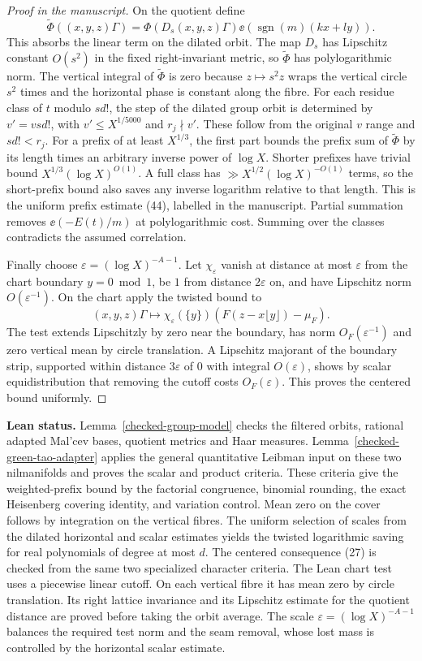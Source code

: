 \begin{proof}[Proof in the manuscript]
On the quotient define
\[
 \widetilde\Phi((x,y,z)\Gamma)
 =\Phi(D_s(x,y,z)\Gamma)\ee(\operatorname{sgn}(m)(kx+ly)).
\]
This absorbs the linear term on the dilated orbit. The map
$D_s$ has Lipschitz constant $O(s^2)$ in the fixed right-invariant
metric, so $\widetilde\Phi$ has polylogarithmic norm. The vertical
integral of $\widetilde\Phi$ is zero because $z\mapsto s^2z$ wraps the
vertical circle $s^2$ times and the horizontal phase is constant
along the fibre. For each residue class of $t$ modulo $sd!$,
the step of the dilated group orbit is determined by $v'=vsd!$,
with $v'\le X^{1/5000}$ and $r_j\nmid v'$.
These follow from the original $v$ range and $sd!<r_j$.
For a prefix of at least $X^{1/3}$, the first part bounds the
prefix sum of $\widetilde\Phi$ by its length times an arbitrary
inverse power of $\log X$. Shorter prefixes have trivial bound
$X^{1/3}(\log X)^{O(1)}$. A full class has
$\gg X^{1/2}(\log X)^{-O(1)}$ terms, so the short-prefix
bound also saves any inverse logarithm relative to that length.
This is the uniform prefix estimate (44), labelled
 in the manuscript.
Partial summation removes $\ee(-E(t)/m)$ at polylogarithmic cost.
Summing over the classes contradicts the assumed correlation.

Finally choose $\varepsilon=(\log X)^{-A-1}$. Let
$\chi_\varepsilon$ vanish at distance at most $\varepsilon$ from
the chart boundary $y=0\bmod1$, be $1$ from distance
$2\varepsilon$ on, and have Lipschitz norm $O(\varepsilon^{-1})$.
On the chart apply the twisted bound to
\[
 (x,y,z)\Gamma\longmapsto \chi_\varepsilon(\{y\})
     (F(z-x\lfloor y\rfloor)-\mu_F).
\]
The test extends Lipschitzly by zero near the boundary, has norm
$O_F(\varepsilon^{-1})$ and zero vertical mean by circle
translation. A Lipschitz majorant of the boundary strip, supported
within distance $3\varepsilon$ of $0$ with integral $O(\varepsilon)$,
shows by scalar equidistribution that removing the cutoff costs
$O_F(\varepsilon)$. This proves the centered bound uniformly.
\end{proof}
\noindent\textbf{Lean status.} Lemma~\ref{checked-group-model} checks
the filtered orbits, rational adapted Mal'cev bases, quotient metrics
and Haar measures. Lemma~\ref{checked-green-tao-adapter} applies the
general quantitative Leibman input on these two nilmanifolds and
proves the scalar and product criteria. These criteria give the weighted-prefix
bound by the factorial congruence, binomial rounding, the exact
Heisenberg covering identity, and variation control. Mean zero on the
cover follows by integration on the vertical fibres.
The uniform selection of scales from the dilated horizontal and scalar
estimates yields the twisted logarithmic saving for real polynomials
of degree at most $d$. The centered consequence (27) is checked
from the same two specialized character criteria. The Lean chart
test uses a piecewise linear cutoff. On each vertical fibre it has
mean zero by circle translation. Its right lattice invariance and
its Lipschitz estimate for the quotient distance are proved before
taking the orbit average. The scale $\varepsilon=(\log X)^{-A-1}$
balances the required test norm and the seam removal, whose lost
mass is controlled by the horizontal scalar estimate.

